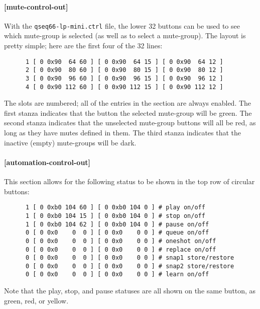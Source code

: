 \paragraph{[mute-control-out]}
\label{paragraph:patterns_mute_control_out}

   With the \texttt{qseq66-lp-mini.ctrl} file, the lower 32 buttons can be used
   to see which mute-group is selected (as well as to select a mute-group).
   The layout is pretty simple; here are the first four of the 32 lines:

   \begin{verbatim}
      1 [ 0 0x90  64 60 ] [ 0 0x90  64 15 ] [ 0 0x90  64 12 ]
      2 [ 0 0x90  80 60 ] [ 0 0x90  80 15 ] [ 0 0x90  80 12 ]
      3 [ 0 0x90  96 60 ] [ 0 0x90  96 15 ] [ 0 0x90  96 12 ]
      4 [ 0 0x90 112 60 ] [ 0 0x90 112 15 ] [ 0 0x90 112 12 ]
   \end{verbatim}

   The slots are numbered; all of the entries in the section are always enabled.
   The first stanza indicates that the button the selected mute-group will be
   green.  The second stanza indicates that the unselected mute-group buttons will
   all be red, as long as they have mutes defined in them.
   The third stanza indicates that the inactive (empty) mute-groups will
   be dark.

\paragraph{[automation-control-out]}
\label{paragraph:patterns_automation_control_out}

   This section allows for the following status to be shown in the top row of
   circular buttons:

   \begin{verbatim}
      1 [ 0 0xb0 104 60 ] [ 0 0xb0 104 0 ] # play on/off
      1 [ 0 0xb0 104 15 ] [ 0 0xb0 104 0 ] # stop on/off
      1 [ 0 0xb0 104 62 ] [ 0 0xb0 104 0 ] # pause on/off
      0 [ 0 0x0    0  0 ] [ 0 0x0    0 0 ] # queue on/off
      0 [ 0 0x0    0  0 ] [ 0 0x0    0 0 ] # oneshot on/off
      0 [ 0 0x0    0  0 ] [ 0 0x0    0 0 ] # replace on/off
      0 [ 0 0x0    0  0 ] [ 0 0x0    0 0 ] # snap1 store/restore
      0 [ 0 0x0    0  0 ] [ 0 0x0    0 0 ] # snap2 store/restore
      0 [ 0 0x0    0  0 ] [ 0 0x0    0 0 ] # learn on/off
   \end{verbatim}

   Note that the play, stop, and pause statuses are all shown on the same button,
   as green, red, or yellow.

